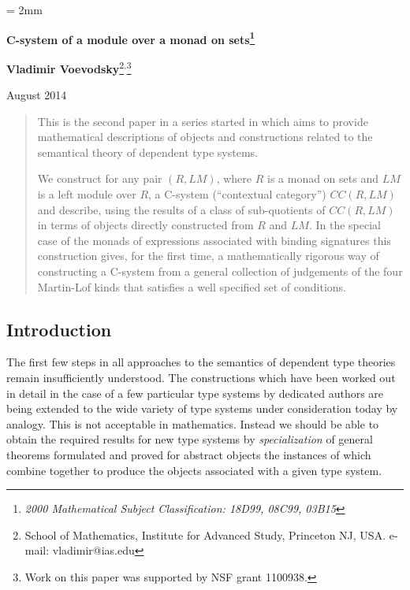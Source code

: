 \documentclass[11pt]{article}
\begin{document}
%
\parskip = 2mm
\begin{center}
{\bf\Large C-system of a module over a monad on sets\footnote{\em 2000 Mathematical Subject Classification: 
18D99, %
08C99, %
03B15 %
}}

\vspace{3mm}

{\large\bf Vladimir Voevodsky}\footnote{School of Mathematics, Institute for Advanced Study,
Princeton NJ, USA. e-mail: vladimir@ias.edu}$^,$\footnote{Work on this paper was supported by NSF grant 1100938.}
\vspace {3mm}

{August 2014}  
\end{center}

\begin{abstract}
This is the second paper in a series started in \cite{Csubsystems} which aims to provide mathematical descriptions of objects and constructions related to the semantical theory of dependent type systems. 

We construct for any pair $(R,LM)$, where $R$ is a monad on sets and $LM$ is a left module over $R$, a C-system (``contextual category'') $CC(R,LM)$ and describe, using the results of \cite{Csubsystems} a class of sub-quotients of $CC(R,LM)$ in terms of objects directly constructed from $R$ and $LM$. In the special case of the monads of expressions associated with  binding signatures this construction gives, for the first time, a mathematically rigorous way of constructing a C-system from a general collection of judgements of the four Martin-Lof kinds that satisfies a well specified set of conditions. 
\end{abstract}



\subsection{Introduction}

The first few steps in all approaches to the semantics of dependent type theories remain insufficiently understood. The constructions which have been worked out in detail in the case of a few particular type systems by dedicated authors are being extended to the wide variety of type systems under consideration today by analogy. This is not acceptable in mathematics. Instead we should be able to obtain the required results for new type systems by {\em specialization} of general theorems formulated and proved for abstract objects the instances of which combine together to produce the objects associated with a given type system. 
\end{document}
